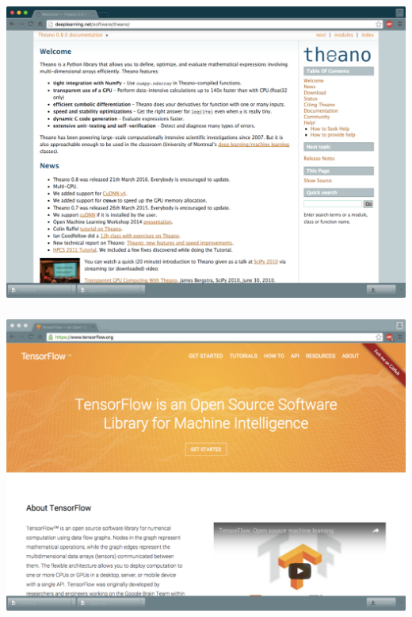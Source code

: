 \documentclass[xetex,mathserif,serif,aspectratio=169]{beamer}
\begin{document}
\begin{frame}[fragile] \frametitle{} \oldB \small

\includegraphics[width=\textwidth]{img/theano.pdf}

\end{frame}

\begin{frame}[fragile] \frametitle{} \oldB \small

\includegraphics[width=\textwidth]{img/tensorflow.pdf}

\end{frame}
\end{document}
